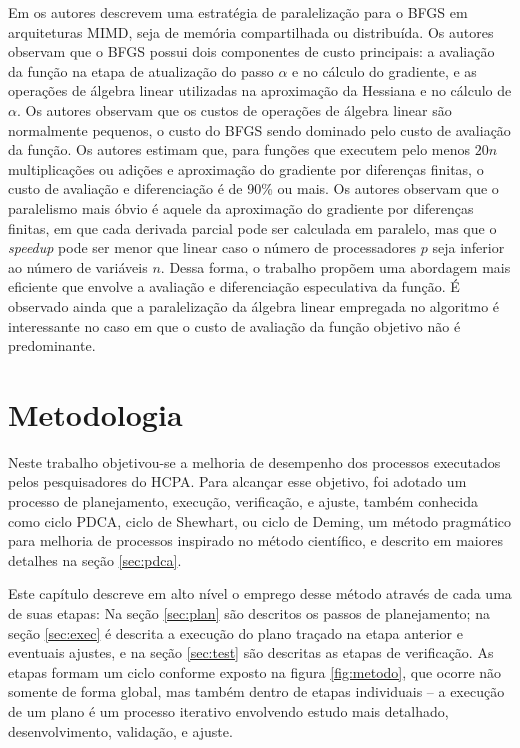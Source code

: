 \documentclass[cic,tc]{iiufrgs}
\begin{document}
Em \cite{byrd1988parallel} os autores descrevem uma estratégia de paralelização
para o BFGS em arquiteturas MIMD, seja de memória compartilhada ou distribuída.
Os autores observam que o BFGS possui dois componentes de custo principais: a
avaliação da função na etapa de atualização do passo $\alpha$ e no cálculo do
gradiente, e as operações de álgebra linear utilizadas na aproximação da
Hessiana e no cálculo de $\alpha$. Os autores observam que os custos de
operações de álgebra linear são normalmente pequenos, o custo do BFGS sendo
dominado pelo custo de avaliação da função. Os autores estimam que, para
funções que executem pelo menos $20n$ multiplicações ou adições e aproximação
do gradiente por diferenças finitas, o custo de avaliação e diferenciação é de
90\% ou mais. Os autores observam que o paralelismo mais óbvio é aquele da
aproximação do gradiente por diferenças finitas, em que cada derivada parcial
pode ser calculada em paralelo, mas que o \textit{speedup} pode ser menor que
linear caso o número de processadores $p$ seja inferior ao número de variáveis
$n$. Dessa forma, o trabalho propõem uma abordagem mais eficiente que envolve a
avaliação e diferenciação especulativa da função. É observado ainda que a
paralelização da álgebra linear empregada no algoritmo é interessante no caso
em que o custo de avaliação da função objetivo não é predominante.

%
%
%
%

\chapter{Metodologia} 
\label{chap:mod}

Neste trabalho objetivou-se a melhoria de desempenho dos processos executados
pelos pesquisadores do HCPA. Para alcançar esse objetivo, foi adotado um
processo de planejamento, execução, verificação, e ajuste, também conhecida
como ciclo PDCA, ciclo de Shewhart, ou ciclo de Deming, um método pragmático
para melhoria de processos inspirado no método científico, e descrito em
maiores detalhes na seção \ref{sec:pdca}.

Este capítulo descreve em alto nível o emprego desse método através de cada uma
de suas etapas: Na seção \ref{sec:plan} são descritos os passos de
planejamento; na seção \ref{sec:exec} é descrita a execução do plano traçado na
etapa anterior e eventuais ajustes, e na seção \ref{sec:test} são descritas as
etapas de verificação. As etapas formam um ciclo conforme exposto na figura
\ref{fig:metodo}, que ocorre não somente de forma global, mas também dentro de
etapas individuais -- a execução de um plano é um processo iterativo
envolvendo estudo mais detalhado, desenvolvimento, validação, e ajuste. 
\end{document}
